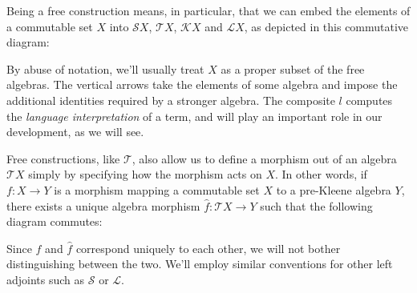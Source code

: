 \documentclass[11pt,a4paper]{amsart}
\theoremstyle{definition}
\begin{document}
%

Being a free construction means, in particular, that we can embed the elements
of a commutable set $X$ into $\mathcal{S}X$, $\mathcal{T}X$, $\mathcal{K}X$ and
$\mathcal{L}X$, as depicted in this commutative diagram:
\begin{center}
\end{center}
By abuse of notation, we'll usually treat $X$ as a proper subset of the free  
algebras. The vertical arrows take the elements of some algebra and impose the
additional identities required by a stronger algebra.  The composite $l$
computes the \emph{language interpretation} of a term, and will play an
important role in our development, as we will see.

Free constructions, like \(\mathcal{T}\), also allow us to define a morphism out
of an algebra $\mathcal{T}X$ simply by specifying how the morphism acts on $X$.
In other words, if $f : X  \to  Y$ is a morphism mapping a commutable set $X$ to a
pre-Kleene algebra $Y$, there exists a unique algebra morphism
$\hat{f} : \mathcal{T}X  \to  Y$ such that the following diagram commutes:
\begin{center}
\end{center}
Since $f$ and $\hat{f}$ correspond uniquely to each other, we will not bother
distinguishing between the two.  We'll employ similar conventions for other left
adjoints such as $\mathcal{S}$ or $\mathcal{L}$.
\end{document}
